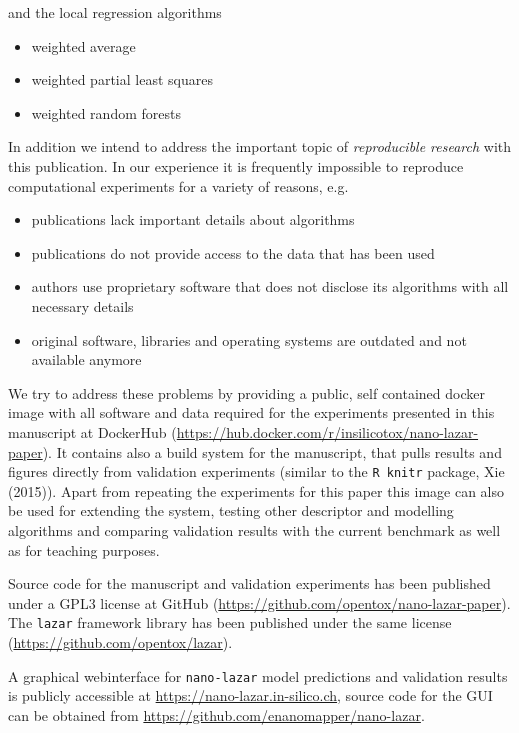 \documentclass[utf8]{frontiersHLTH} %
\providecommand{\tightlist}{%
  \setlength{\itemsep}{0pt}\setlength{\parskip}{0pt}}
\begin{document}
and the local regression algorithms

\begin{itemize}
\tightlist
\item
  weighted average
\item
  weighted partial least squares
\item
  weighted random forests
\end{itemize}

In addition we intend to address the important topic of
\emph{reproducible research} with this publication. In our experience it
is frequently impossible to reproduce computational experiments for a
variety of reasons, e.g.

\begin{itemize}
\tightlist
\item
  publications lack important details about algorithms
\item
  publications do not provide access to the data that has been used
\item
  authors use proprietary software that does not disclose its algorithms
  with all necessary details
\item
  original software, libraries and operating systems are outdated and
  not available anymore
\end{itemize}

We try to address these problems by providing a public, self contained
docker image with all software and data required for the experiments
presented in this manuscript at DockerHub
(\url{https://hub.docker.com/r/insilicotox/nano-lazar-paper}). It
contains also a build system for the manuscript, that pulls results and
figures directly from validation experiments (similar to the
\texttt{R\ knitr} package, Xie (2015)). Apart from repeating the
experiments for this paper this image can also be used for extending the
system, testing other descriptor and modelling algorithms and comparing
validation results with the current benchmark as well as for teaching
purposes.

Source code for the manuscript and validation experiments has been
published under a GPL3 license at GitHub
(\url{https://github.com/opentox/nano-lazar-paper}). The \texttt{lazar}
framework library has been published under the same license
(\url{https://github.com/opentox/lazar}).

A graphical webinterface for \texttt{nano-lazar} model predictions and
validation results is publicly accessible at
\url{https://nano-lazar.in-silico.ch}, source code for the GUI can be
obtained from \url{https://github.com/enanomapper/nano-lazar}.
\end{document}
